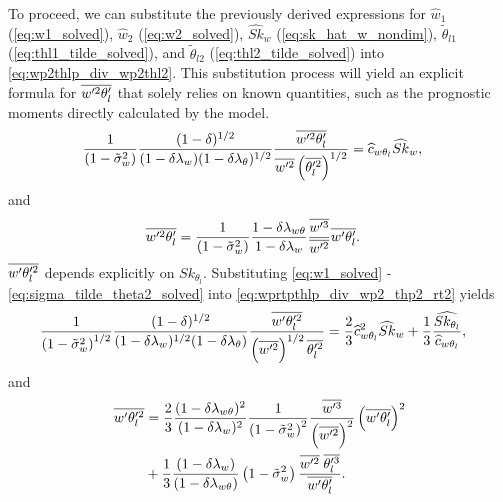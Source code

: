To proceed, we can substitute the previously derived expressions for
$\widehat{w}_1$ (\cref{eq:w1_solved}), $\widehat{w}_2$ (\cref{eq:w2_solved}),
$\widehat{Sk}_w$ (\cref{eq:sk_hat_w_nondim}),
$\tilde{\theta}_{l1}$ (\cref{eq:thl1_tilde_solved}),
and $\tilde{\theta}_{l2}$ (\cref{eq:thl2_tilde_solved}) into \cref{eq:wp2thlp_div_wp2thl2}.
This substitution process will yield an explicit formula for $\overline{w'^2 \theta_l'}$ that solely relies on known quantities,
such as the prognostic moments directly calculated by the model.
\begin{align}
    \label{eq:wp2thlp_sk_w_solved}
    \frac{1}{\left( 1 - \tilde{\sigma}_w^2 \right)} \frac{(1-\delta)^{1/2}}{(1-\delta \lambda_w) (1-\delta \lambda_\theta)^{1/2}} \frac{\overline{w'^2\theta_l'}}{\overline{w'^2} \left(\overline{\theta_l'^2} \right)^{1/2}}
    &= \widehat{c}_{w\theta_l} \widehat{Sk}_w,
\end{align}
and
\begin{align}
    \label{eq:wp2thlp_solved}
    \overline{w'^2\theta_l'}
    &= \frac{1}{\left( 1 - \tilde{\sigma}_w^2 \right)} \frac{1 - \delta \lambda_{w\theta}}{1-\delta \lambda_w} \frac{\overline{w'^3}}{\overline{w'^2}} \overline{w' \theta_l'}.
\end{align}
$\overline{w' \theta_l'^2}$ depends explicitly on $Sk_{\theta_l}$.
Substituting \cref{eq:w1_solved} - \cref{eq:sigma_tilde_theta2_solved}
into \cref{eq:wprtpthlp_div_wp2_thp2_rt2} yields
\begin{align}
    \label{eq:wpthlp2_sk_w_solved}
    \frac{1}{\left( 1 - \tilde{\sigma}_w^2 \right)^{1/2}} \frac{(1-\delta)^{1/2}}{(1-\delta \lambda_w)^{1/2} (1-\delta \lambda_\theta)} \frac{\overline{w'\theta_l'^2}}{\left(\overline{w'^2}\right)^{1/2} \overline{\theta_l'^2}}
    &= \frac{2}{3} \widehat{c}_{w\theta_l}^2 \widehat{Sk}_w + \frac{1}{3} \frac{ \widehat{Sk_{\theta_l}} } {\widehat{c}_{w\theta_l}},
\end{align}
and
\begin{align}
    \label{eq:wpthlp2_solved}
    \overline{w'\theta_l'^2}
    &= \frac{2}{3} \frac{(1-\delta \lambda_{w \theta})^2}{(1-\delta \lambda_w)^2} \frac{1}{\left( 1 - \tilde{\sigma}_w^2 \right)^2} \frac{\overline{w'^3}}{\left(\overline{w'^2} \right)^2} \left(\overline{w' \theta_l'} \right)^2 \nonumber\\
    &+ \frac{1}{3} \frac{(1-\delta \lambda_w)}{(1-\delta \lambda_{w \theta})} \left( 1 - \tilde{\sigma}_w^2 \right) \frac{\overline{w'^2} \; \overline{\theta_l'^3}}{\overline{w' \theta_l'}}.
\end{align}

